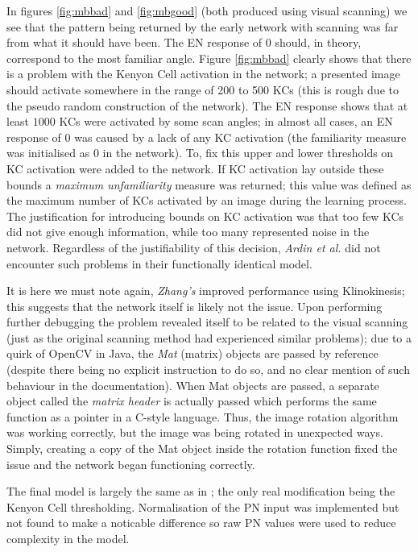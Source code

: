 \documentclass[a4paper,12pt]{article}
\begin{document}
In figures \ref{fig:mbbad} and \ref{fig:mbgood} (both produced using visual scanning) we see that the pattern being
returned by the early network with scanning was far from what it should have been. The EN response of 0 should, in theory,
correspond to the most familiar angle. Figure \ref{fig:mbbad} clearly shows that there is a problem with the Kenyon Cell
activation in the network; a presented image should activate somewhere in the range of 200 to 500 KCs (this is rough due
to the pseudo random construction of the network). The EN response shows that at least $1000$ KCs were activated by some
scan angles; in almost all cases, an EN response of $0$ was caused by a lack of any KC activation (the familiarity measure
was initialised as $0$ in the network). To, fix this upper and lower thresholds on KC activation were added to the
network. If KC activation lay outside these bounds a \textit{maximum unfamiliarity} measure was returned; this value
was defined as the maximum number of KCs activated by an image during the learning process. The justification for introducing
bounds on KC activation was that too few KCs did not give enough information, while too many represented noise in the network.
Regardless of the justifiability of this decision, \textit{Ardin et al.} did not encounter such problems in their functionally
identical model.
\newline

It is here we must note again, \textit{Zhang's} improved performance using Klinokinesis; this suggests that the network itself
is likely not the issue. Upon performing further debugging
the problem revealed itself to be related to the visual scanning (just as the original scanning method had experienced similar
problems); due to a quirk of OpenCV in Java, the \textit{Mat} (matrix) objects are passed by reference (despite there being
no explicit instruction to do so, and no clear mention of such behaviour in the documentation). When Mat objects are passed,
a separate object called the \textit{matrix header} is actually passed which performs the same function as a pointer in a C-style
language. Thus, the image rotation algorithm was working correctly, but the image was being rotated in unexpected ways. Simply,
creating a copy of the Mat object inside the rotation function fixed the issue and the network began functioning correctly.
\newline

The final model is largely the same as in \cite{Eberding}; the only real modification being the Kenyon Cell thresholding.
Normalisation of the PN input was implemented but not found to make a noticable difference so raw PN values were used
to reduce complexity in the model. 
\end{document}
